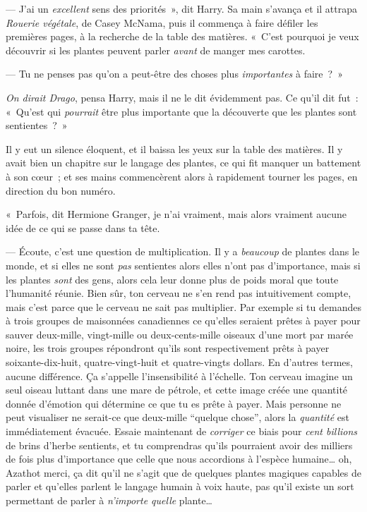 --- J'ai un \emph{excellent} sens des priorités~», dit Harry.
Sa main s'avança et il attrapa \emph{Rouerie végétale}, de Casey McNama, puis il commença à faire défiler les premières pages, à la recherche de la table des matières.
«~C'est pourquoi je veux découvrir si les plantes peuvent parler \emph{avant} de manger mes carottes.

--- Tu ne penses pas qu'on a peut-être des choses plus \emph{importantes} à faire~?~»

\emph{On dirait Drago}, pensa Harry, mais il ne le dit évidemment pas.
Ce qu'il dit fut~: «~Qu'est qui \emph{pourrait} être plus importante que la découverte que les plantes sont sentientes~?~»

Il y eut un silence éloquent, et il baissa les yeux sur la table des matières.
Il y avait bien un chapitre sur le langage des plantes, ce qui fit manquer un battement à son cœur~; et ses mains commencèrent alors à rapidement tourner les pages, en direction du bon numéro.

«~Parfois, dit Hermione Granger, je n'ai vraiment, mais alors vraiment aucune idée de ce qui se passe dans ta tête.

--- Écoute, c'est une question de multiplication.
Il y a \emph{beaucoup} de plantes dans le monde, et si elles ne sont \emph{pas} sentientes alors elles n'ont pas d'importance, mais si les plantes \emph{sont} des gens, alors cela leur donne plus de poids moral que toute l'humanité réunie.
Bien sûr, ton cerveau ne s'en rend pas intuitivement compte, mais c'est parce que le cerveau ne sait pas multiplier.
Par exemple si tu demandes à trois groupes de maisonnées canadiennes ce qu'elles seraient prêtes à payer pour sauver deux-mille, vingt-mille ou deux-cents-mille oiseaux d'une mort par marée noire, les trois groupes répondront qu'ils sont respectivement prêts à payer soixante-dix-huit, quatre-vingt-huit et quatre-vingts dollars.
En d'autres termes, aucune différence.
Ça s'appelle l'insensibilité à l'échelle.
Ton cerveau imagine un seul oiseau luttant dans une mare de pétrole, et cette image créée une quantité donnée d'émotion qui détermine ce que tu es prête à payer.
Mais personne ne peut visualiser ne serait-ce que deux-mille “quelque chose”, alors la \emph{quantité} est immédiatement évacuée.
Essaie maintenant de \emph{corriger} ce biais pour \emph{cent billions} de brins d'herbe sentients, et tu comprendras qu'ils pourraient avoir des milliers de fois plus d'importance que celle que nous accordions à l'espèce humaine… oh, Azathot merci, ça dit qu'il ne s'agit que de quelques plantes magiques capables de parler et qu'elles parlent le langage humain à voix haute, pas qu'il existe un sort permettant de parler à \emph{n'importe quelle} plante…

